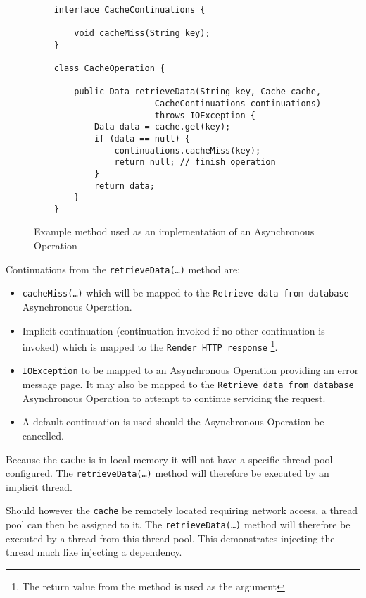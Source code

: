 \documentclass[prodmode]{style/acmlarge}
\begin{document}
\begin{figure}[tp]
\centering
\begin{verbatim}

    interface CacheContinuations {

        void cacheMiss(String key);
    }

    class CacheOperation {
    
        public Data retrieveData(String key, Cache cache, 
                        CacheContinuations continuations)
                        throws IOException {
        	Data data = cache.get(key);
        	if (data == null) {
        	    continuations.cacheMiss(key);
        	    return null; // finish operation
        	}
        	return data;
        }
    }
\end{verbatim}
\caption{Example method used as an implementation of an Asynchronous Operation}
\label{fig:Example_Method_Operation}
\end{figure}

Continuations from the \texttt{retrieveData(\ldots)} method are:
\begin{itemize}
  \item \texttt{cacheMiss(\ldots)} which will be mapped to the \texttt{Retrieve data from database} Asynchronous Operation.
  \item Implicit continuation (continuation invoked if no other continuation is invoked) which is mapped to the \texttt{Render HTTP response} \footnote{The return value from the method is used as the argument}.
  \item \texttt{IOException} to be mapped to an Asynchronous Operation providing an error message page.  It may also be mapped to the \texttt{Retrieve data from database} Asynchronous Operation to attempt to continue servicing the request.
  \item A default continuation is used should the Asynchronous Operation be cancelled.
\end{itemize}

Because the \texttt{cache} is in local memory it will not have a specific thread
pool configured.  The \texttt{retrieveData(\ldots)} method will therefore be
executed by an implicit thread.

Should however the \texttt{cache} be remotely located requiring network access,
a thread pool can then be assigned to it.  The \texttt{retrieveData(\ldots)}
method will therefore be executed by a thread from this thread pool.  This
demonstrates injecting the thread much like injecting a dependency.
\end{document}
